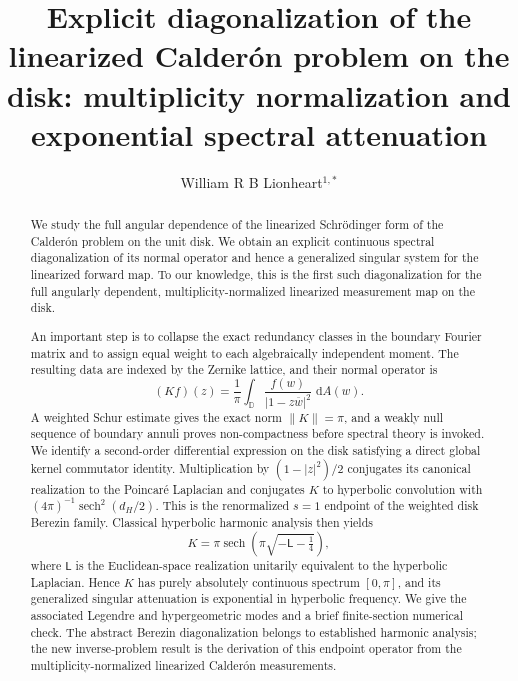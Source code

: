 \IfFileExists{iopjournal.cls}{\documentclass{iopjournal}}{\documentclass{iopjournal-draft}}
\theoremstyle{definition}
\theoremstyle{remark}
\newcommand{\D}{\mathbb D}
\newcommand{\dd}{\,\mathrm d}
\newcommand{\sech}{\operatorname{sech}}
\numberwithin{equation}{section}
\begin{document}

\title{Explicit diagonalization of the linearized Calder\'on problem on the disk: multiplicity normalization and exponential spectral attenuation}

\author{William R B Lionheart$^{1,*}$}



\begin{abstract}
We study the full angular dependence of the linearized Schr\"odinger form of the Calder\'on problem on the unit disk.  We obtain an explicit continuous spectral diagonalization of its normal operator and hence a generalized singular system for the linearized forward map.  To our knowledge, this is the first such diagonalization for the full angularly dependent, multiplicity-normalized linearized measurement map on the disk.

An important step is to collapse the exact redundancy classes in the boundary Fourier matrix and to assign equal weight to each algebraically independent moment.  The resulting data are indexed by the Zernike lattice, and their normal operator is
\[
 (Kf)(z)=\frac1\pi\int_{\D}\frac{f(w)}{|1-z\overline w|^2}\,\dd A(w).
\]
A weighted Schur estimate gives the exact norm $\|K\|=\pi$, and a weakly null sequence of boundary annuli proves non-compactness before spectral theory is invoked.  We identify a second-order differential expression on the disk satisfying a direct global kernel commutator identity.  Multiplication by $(1-|z|^2)/2$ conjugates its canonical realization to the Poincar\'e Laplacian and conjugates $K$ to hyperbolic convolution with $(4\pi)^{-1}\sech^2(d_H/2)$.  This is the renormalized $s=1$ endpoint of the weighted disk Berezin family.  Classical hyperbolic harmonic analysis then yields
\[
 K=\pi\sech\!\left(\pi\sqrt{-\mathsf L-\tfrac14}\right),
\]
where $\mathsf L$ is the Euclidean-space realization unitarily equivalent to the hyperbolic Laplacian.  Hence $K$ has purely absolutely continuous spectrum $[0,\pi]$, and its generalized singular attenuation is exponential in hyperbolic frequency.  We give the associated Legendre and hypergeometric modes and a brief finite-section numerical check.  The abstract Berezin diagonalization belongs to established harmonic analysis; the new inverse-problem result is the derivation of this endpoint operator from the multiplicity-normalized linearized Calder\'on measurements.
\end{abstract}
\end{document}
